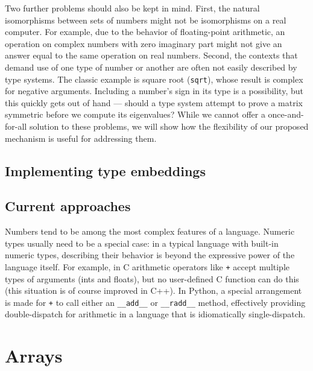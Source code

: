 Two further problems should also be kept in mind. First, the natural isomorphisms
between sets of numbers might not be isomorphisms on a real computer. For example,
due to the behavior of floating-point arithmetic, an operation on complex numbers
with zero imaginary part might not give an answer equal to the same operation on
real numbers. Second, the contexts that demand use of one type of number or
another are often not easily described by type systems. The classic example is
square root (\texttt{sqrt}), whose result is complex for negative arguments.
Including a number's sign in its type is a possibility, but this quickly gets
out of hand --- should a type system attempt to prove a matrix symmetric before
we compute its eigenvalues? While we cannot offer a once-and-for-all solution
to these problems, we will show how the flexibility of our proposed mechanism
is useful for addressing them.


\subsection{Implementing type embeddings}




\subsection{Current approaches}

Numbers tend to be among the most
complex features of a language. Numeric types usually need to be a special
case: in a typical language with built-in numeric types, describing their
behavior is beyond the expressive power of the language itself. For example,
in C arithmetic operators like \texttt{+} accept multiple types of arguments
(ints and floats), but no user-defined C function can do this (this situation
is of course improved in C++). In Python, a special arrangement is made for
\texttt{+} to call either an \texttt{\_\_add\_\_} or \texttt{\_\_radd\_\_} method,
effectively providing double-dispatch for arithmetic in a language that is
idiomatically single-dispatch.



\section{Arrays}

